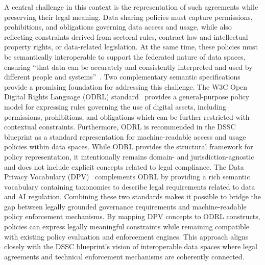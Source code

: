 A central challenge in this context
is the representation of such agreements
while preserving their legal meaning.
Data sharing policies must capture
permissions, prohibitions, and obligations
governing data access and usage,
while also reflecting constraints
derived from sectoral rules, 
contract law and intellectual property rights,
or data-related legislation.
At the same time,
these policies must be semantically interoperable
to support the federated nature of data spaces,
ensuring ``that data can be accurately and
consistently interpreted and used by
different people and systems''~\cite{steinbuss_semantic_2025}.
Two complementary semantic specifications provide
a promising foundation for addressing this challenge.
The W3C Open Digital Rights Language (ODRL) standard~\cite{iannella_odrl_2018}
provides a general-purpose policy model
for expressing rules
governing the use of digital assets,
including permissions, prohibitions, and obligations
which can be further restricted with contextual constraints.
Furthermore,
ODRL is recommended in the DSSC blueprint
as a standard representation for machine-readable
access and usage policies within data spaces.
While ODRL provides the structural framework for policy representation,
it intentionally remains domain- and jurisdiction-agnostic and
does not include explicit concepts related to legal compliance.
The Data Privacy Vocabulary (DPV)~\cite{pandit_data_2024}
complements ODRL by providing a rich semantic vocabulary
containing taxonomies to describe legal requirements
related to data and AI regulation.
Combining these two standards
makes it possible to bridge the gap between
legally grounded governance requirements and
machine-readable policy enforcement mechanisms.
By mapping DPV concepts to ODRL constructs,
policies can express legally meaningful constraints
while remaining compatible with existing policy evaluation and enforcement engines.
This approach aligns closely with
the DSSC blueprint's vision of interoperable data spaces
where legal agreements and
technical enforcement mechanisms
are coherently connected.

